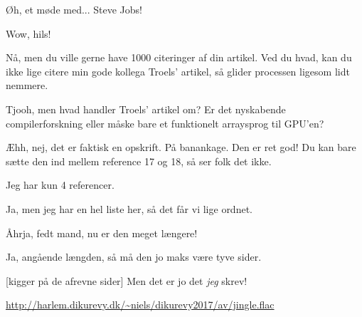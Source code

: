 \documentclass[a4paper,11pt]{article}
\begin{document}
\begin{sketch}
  Øh, et møde med... Steve Jobs!

 Wow, hils!


 Nå, men du ville gerne have 1000 citeringer af din artikel.  Ved du
hvad, kan du ikke lige citere min gode kollega Troels' artikel, så glider
processen ligesom lidt nemmere.

 Tjooh, men hvad handler Troels' artikel om? Er det 
nyskabende compilerforskning eller  måske bare et funktionelt
arraysprog til GPU'en?

 Æhh, nej, det er faktisk en opskrift.  På banankage.  Den er ret god!
Du kan bare sætte den ind mellem reference 17 og 18, så ser folk det ikke.

 Jeg har kun 4 referencer.

 Ja, men jeg har en hel liste her, så det får vi lige ordnet.


 Åhrja, fedt mand, nu er den meget længere!

 Ja, angående længden, så må den jo maks være tyve sider.


[kigger på de afrevne sider] Men det er jo det \emph{jeg} skrev!



\noindent\url{http://harlem.dikurevy.dk/~niels/dikurevy2017/av/jingle.flac}



\end{sketch}
\end{document}
